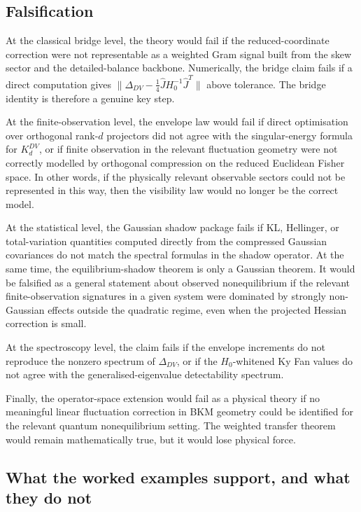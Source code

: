 \documentclass[11pt,a4paper]{article}
\numberwithin{equation}{section}
\theoremstyle{thmcompact}
\theoremstyle{remark}
\begin{document}
\subsection{Falsification}

At the classical bridge level, the theory would fail if the reduced-coordinate correction were not representable as a weighted Gram signal built from the skew sector and the detailed-balance backbone. Numerically, the bridge claim fails if a direct computation gives \(\|\Delta_{DV}-\tfrac14\widehat J H_0^{-1}\widehat J^T\|\) above tolerance. The bridge identity is therefore a genuine key step.

At the finite-observation level, the envelope law would fail if direct optimisation over orthogonal rank-\(d\) projectors did not agree with the singular-energy formula for \(K_d^{DV}\), or if finite observation in the relevant fluctuation geometry were not correctly modelled by orthogonal compression on the reduced Euclidean Fisher space. In other words, if the physically relevant observable sectors could not be represented in this way, then the visibility law would no longer be the correct model.

At the statistical level, the Gaussian shadow package fails if KL, Hellinger, or total-variation quantities computed directly from the compressed Gaussian covariances do not match the spectral formulas in the shadow operator. At the same time, the equilibrium-shadow theorem is only a Gaussian theorem. It would be falsified as a general statement about observed nonequilibrium if the relevant finite-observation signatures in a given system were dominated by strongly non-Gaussian effects outside the quadratic regime, even when the projected Hessian correction is small.

At the spectroscopy level, the claim fails if the envelope increments do not reproduce the nonzero spectrum of \(\Delta_{DV}\), or if the \(H_0\)-whitened Ky Fan values do not agree with the generalised-eigenvalue detectability spectrum.

Finally, the operator-space extension would fail as a physical theory if no meaningful linear fluctuation correction in BKM geometry could be identified for the relevant quantum nonequilibrium setting. The weighted transfer theorem would remain mathematically true, but it would lose physical force.

\subsection{What the worked examples support, and what they do not}
\end{document}
